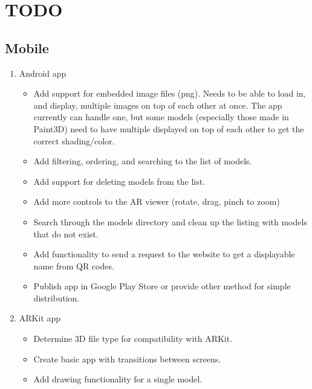 
\chapter{TODO}

    \section{Mobile}
        \begin{enumerate}
            \item Android app
            \begin{itemize}
                \item Add support for embedded image files (png).  Needs to be able to load in, and display, multiple images on top of each other at once.  The app currently can handle one, but some models (especially those made in Paint3D) need to have multiple displayed on top of each other to get the correct shading/color.

                \item Add filtering, ordering, and searching to the list of models.

                \item Add support for deleting models from the list.

                \item Add more controls to the AR viewer (rotate, drag, pinch to zoom)

                \item Search through the models directory and clean up the listing with models that do not exist.

                \item Add functionality to send a request to the website to get a displayable name from QR codes.

                \item Publish app in Google Play Store or provide other method for simple distribution.

            \end{itemize}
            \item ARKit app
            \begin{itemize}
                \item Determine 3D file type for compatibility with ARKit.

                \item Create basic app with transitions between screens.

                \item Add drawing functionality for a single model.


\end{itemize}
\end{enumerate}
